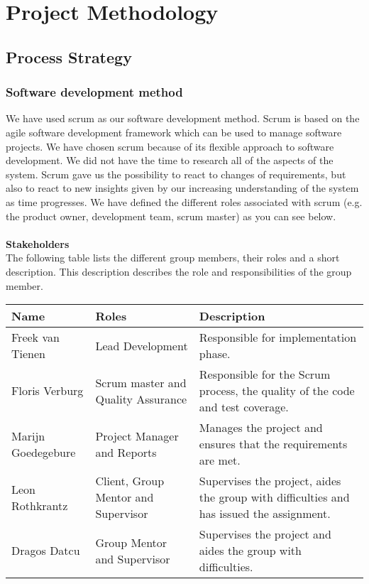 \chapter{Project Methodology}


\section{Process Strategy}


\subsection{Software development method}
We have used scrum as our software development method.
Scrum is based on the agile software development framework which can be used to manage software projects.
We have chosen scrum because of its flexible approach to software development.
We did not have the time to research all of the aspects of the system.
Scrum gave us the possibility to react to changes of requirements, but also to react to new insights given by our increasing understanding of the system as time progresses.
We have defined the different roles associated with scrum (e.g. the product owner, development team, scrum master) as you can see below.
\\\\
\noindent\textbf{Stakeholders}\\
The following table lists the different group members, their roles and a short description.
This description describes the role and responsibilities of the group member.\\
\begin{tabular}{|l|l|p{5cm}|}
\hline
Name & Roles & Description\\
\hline
Freek van Tienen & Lead Development & Responsible for implementation phase.\\
\hline
Floris Verburg & Scrum master and Quality Assurance & Responsible for the Scrum process, the quality of the code and test coverage.\\
\hline
Marijn Goedegebure & Project Manager and Reports & Manages the project and ensures that the requirements are met.\\
\hline
Leon Rothkrantz & Client, Group Mentor and Supervisor & Supervises the project, aides the group with difficulties and has issued the assignment.\\
\hline
Dragos Datcu &  Group Mentor and Supervisor & Supervises the project and aides the group with difficulties.\\
\hline
\end{tabular}

